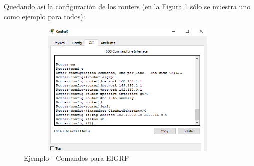 \documentclass{article}
\begin{document}
Quedando así la configuración de los routers (en la Figura \ref{fig:ej3} sólo se muestra uno como ejemplo para todos):

\begin{figure}[h!]
\centering
\includegraphics[width=11cm, height=6.5cm]{Ej3.png}
\caption{Ejemplo - Comandos para EIGRP}
\label{fig:ej3}
\end{figure}

\newpage
\end{document}
